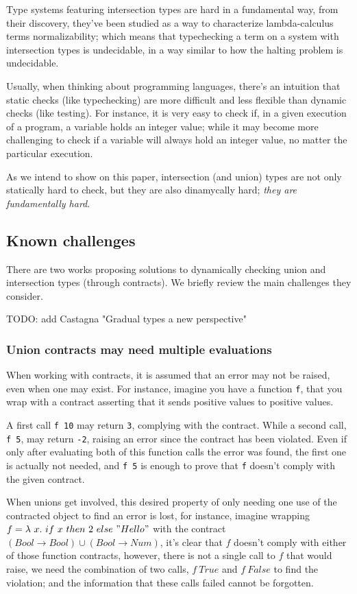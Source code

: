 Type systems featuring intersection types are hard in a fundamental way,
from their discovery, they've been studied as a way to characterize
lambda-calculus terms normalizability; which means that typechecking a
term on a system with intersection types is undecidable, in a way
similar to how the halting problem is undecidable.

Usually, when thinking about programming languages, there's an intuition
that static checks (like typechecking) are more difficult and less flexible
than dynamic checks (like testing). For instance, it is very easy to check if,
in a given execution of a program, a variable holds an integer value; while it
may become more challenging to check if a variable will always hold an integer value,
no matter the particular execution.

As we intend to show on this paper, intersection (and union) types are not only
statically hard to check, but they are also dinamycally hard;
\textit{they are fundamentally hard}.

\subsection{Known challenges}

There are two works proposing solutions to dynamically checking union and intersection
types (through contracts). We briefly review the main challenges they consider.

TODO: add Castagna "Gradual types a new perspective"

\subsubsection*{Union contracts may need multiple evaluations}

When working with contracts, it is assumed that an error may not be raised, even
when one may exist. For instance, imagine you have a function \texttt{f}, that
you wrap with a contract asserting that it sends positive values to positive values.

A first call \texttt{f 10} may return \texttt{3}, complying with the contract.
While a second call, \texttt{f 5}, may return \texttt{-2}, raising an error since
the contract has been violated. Even if only after evaluating both of this function calls
the error was found, the first one is actually not needed, and \texttt{f 5} is enough to
prove that \texttt{f} doesn't comply with the given contract.

When unions get involved, this desired property of only needing one
use of the contracted object to find an error is lost,
for instance, imagine wrapping $f = \lambda~x.~if~x~then~2~else~"Hello"$
with the contract $(Bool \rightarrow Bool) \cup (Bool \rightarrow Num)$, it's
clear that $f$ doesn't comply with either of those function contracts, however, there
is not a single call to $f$ that would raise, we need the combination of two calls,
$f~True$ and $f~False$ to find the violation; and the information that these calls failed
cannot be forgotten.

